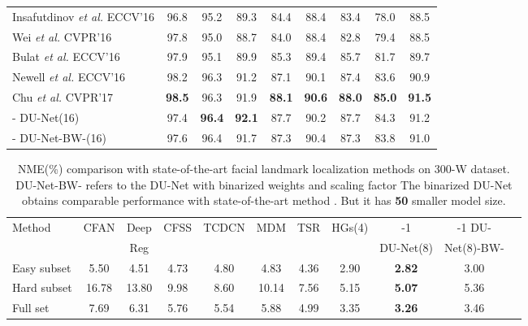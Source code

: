 \documentclass[runningheads]{llncs}
\begin{document}
\begin{table}[t!]
\begin{center}
\begin{tabular}{@{}lcccccccc@{}}
Insafutdinov \textit{et al.} ECCV'16 \cite{insafutdinov2016deepercut}&96.8 & 95.2 & 89.3 & 84.4 & 88.4 & 83.4 & 78.0 & 88.5\\
Wei \textit{et al.} CVPR'16 \cite{wei2016convolutional} & 97.8 & 95.0 & 88.7 & 84.0 & 88.4 & 82.8 & 79.4 & 88.5\\
Bulat \textit{et al.} ECCV'16 \cite{bulat2016human} & 97.9 & 95.1 & 89.9 & 85.3 & 89.4 & 85.7 & 81.7 & 89.7\\
Newell {\it et al.}  ECCV'16 \cite{newell2016stacked} & 98.2 & 96.3 & 91.2 & 87.1 & 90.1 & 87.4 & 83.6 & 90.9\\
Chu \textit{et al.} CVPR'17 \cite{chu2017multi} & {\bf 98.5} & 96.3 & 91.9 & {\bf 88.1} & {\bf 90.6} & {\bf 88.0} & {\bf 85.0} & {\bf 91.5}\\
\hline
- DU-Net(16) & 97.4  & {\bf 96.4}  & {\bf 92.1}  & 87.7  & 90.2  & 87.7 & 84.3 & 91.2\\
- DU-Net-BW-(16) & 97.6  & 96.4  & 91.7  & 87.3  & 90.4  & 87.3 & 83.8 & 91.0\\
\bottomrule
\end{tabular}
\end{center}
\end{table}

\begin{table}[t]
\begin{center}
\caption{NME(\%) comparison with state-of-the-art facial landmark localization methods on 300-W dataset. DU-Net-BW- refers to the DU-Net with binarized weights and scaling factor  The binarized DU-Net obtains comparable performance with state-of-the-art method \cite{newell2016stacked}. But it has {\bf 50} smaller model size.}\label{tb:300w}
\small
\setlength\tabcolsep{0.5pt}
\begin{tabular}{lccccccc|ccc}
\toprule
\multirow{2}{*}{Method} & CFAN  & Deep  & CFSS  
& TCDCN  & MDM  & TSR & HGs(4) & -1 & -1 DU-\\
& \cite{zhang2014coarse} & Reg \cite{shi2014deep} & \cite{zhu2015face} & \cite{zhang2014facial} &  \cite{trigeorgis2016mnemonic} & \cite{lv2017deep} & \cite{newell2016stacked} & DU-Net(8)& Net(8)-BW-\\
\hline
Easy subset  & 5.50 & 4.51  &  4.73 & 4.80 & 4.83  & 4.36 & 2.90 & {\bf 2.82} & 3.00\\ 
Hard subset  & 16.78 &  13.80  & 9.98 & 8.60 & 10.14 &  7.56 & 5.15 &{\bf 5.07} & 5.36\\
Full set   & 7.69 & 6.31 & 5.76 & 5.54 & 5.88 & 4.99 & 3.35 & {\bf 3.26} & 3.46\\
\bottomrule
\end{tabular}
\end{center}
\end{table}
\end{document}
